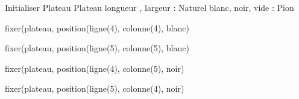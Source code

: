 \begin{algorithme}
	\small
	\fonction
	{Initialiser Plateau}
	{}
	{Plateau}
	{longueur , largeur : Naturel 
	blanc, noir, vide : Pion}
	{
	
	fixer(plateau, position(ligne(4), colonne(4), blanc)
	
	fixer(plateau, position(ligne(5), colonne(5), blanc)

	fixer(plateau, position(ligne(4), colonne(5), noir)

	fixer(plateau, position(ligne(5), colonne(4), noir)
	}
\end{algorithme}